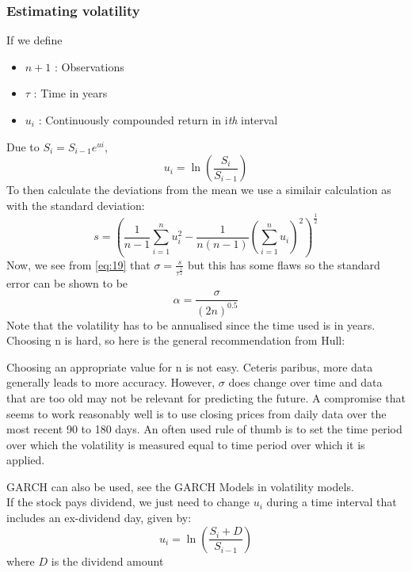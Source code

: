 \documentclass{article}
\begin{document}
\subsubsection{Estimating volatility}
If we define
\begin{itemize}
    \item $n+1$ : Observations
    \item $\tau$ : Time in years
    \item $u_{i}$ : Continuously compounded return in i\emph{th} interval
\end{itemize}
Due to $S_{i}= S_{i-1} e^{ui}$,
\begin{equation}
    u_{i} = \ln \left(\frac{S_{i}}{S_{i-1}}\right)
\end{equation}
To then calculate the deviations from the mean we use a similair calculation as with the standard deviation:
\begin{equation*}
    s = \left(\frac{1}{n-1} \sum_{i=1}^{n}u_{i}^{2} - \frac{1}{n(n-1)}\left(\sum_{i=1}^{n}u_{i}\right)^{2}\right)^\frac{1}{2}
\end{equation*}
Now, we see from \ref{eq:19} that $\sigma  = \frac{s}{\tau^{\frac{1}{2}}}$ but this has some flaws so the standard error can be shown to be
\begin{equation}
    \alpha = \frac{\sigma }{(2n)^{0.5}}
\end{equation}
Note that the volatility has to be annualised since the time used is in years.
Choosing n is hard, so here is the general recommendation from Hull:
\begin{displayquote}
Choosing an appropriate value for n is not easy. Ceteris paribus, more data generally leads to more accuracy. However, $\sigma$ does change over time and data that are too old may not be relevant for predicting the future. A compromise that seems to work reasonably well is to use closing prices from daily data over the most recent 90 to 180 days. An often used rule of thumb is to set the time period over which the volatility is measured equal to time period over which it is applied.
\end{displayquote}
GARCH can also be used, see the GARCH Models in volatility models. \\
If the stock pays dividend, we just need to change $u_{i}$ during a time interval that includes an ex-dividend day, given by:
\begin{equation}
    u_{i} = \ln \left(\frac{S_{i}+D}{S_{i-1}}\right)
\end{equation}
where $D$ is the dividend amount
\end{document}
